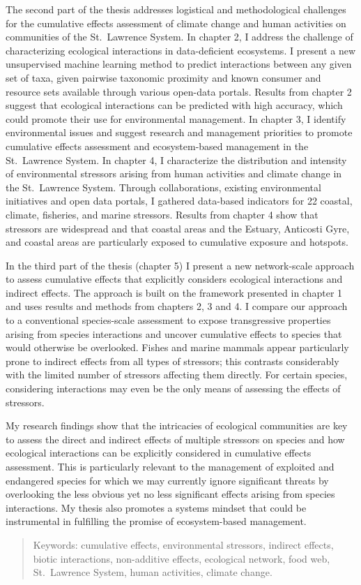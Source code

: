 The second part of the thesis addresses logistical and methodological
challenges for the cumulative effects assessment of climate change and
human activities on communities of the St.~Lawrence System. In chapter
2, I address the challenge of characterizing ecological interactions in
data-deficient ecosystems. I present a new unsupervised machine learning
method to predict interactions between any given set of taxa, given
pairwise taxonomic proximity and known consumer and resource sets
available through various open-data portals. Results from chapter 2
suggest that ecological interactions can be predicted with high
accuracy, which could promote their use for environmental management. In
chapter 3, I identify environmental issues and suggest research and
management priorities to promote cumulative effects assessment and
ecosystem-based management in the St.~Lawrence System. In chapter 4, I
characterize the distribution and intensity of environmental stressors
arising from human activities and climate change in the St.~Lawrence
System. Through collaborations, existing environmental initiatives and
open data portals, I gathered data-based indicators for 22 coastal,
climate, fisheries, and marine stressors. Results from chapter 4 show
that stressors are widespread and that coastal areas and the Estuary,
Anticosti Gyre, and coastal areas are particularly exposed to cumulative
exposure and hotspots.

In the third part of the thesis (chapter 5) I present a new
network-scale approach to assess cumulative effects that explicitly
considers ecological interactions and indirect effects. The approach is
built on the framework presented in chapter 1 and uses results and
methods from chapters 2, 3 and 4. I compare our approach to a
conventional species-scale assessment to expose transgressive properties
arising from species interactions and uncover cumulative effects to
species that would otherwise be overlooked. Fishes and marine mammals
appear particularly prone to indirect effects from all types of
stressors; this contrasts considerably with the limited number of
stressors affecting them directly. For certain species, considering
interactions may even be the only means of assessing the effects of
stressors.

My research findings show that the intricacies of ecological communities
are key to assess the direct and indirect effects of multiple stressors
on species and how ecological interactions can be explicitly considered
in cumulative effects assessment. This is particularly relevant to the
management of exploited and endangered species for which we may
currently ignore significant threats by overlooking the less obvious yet
no less significant effects arising from species interactions. My thesis
also promotes a systems mindset that could be instrumental in fulfilling
the promise of ecosystem-based management.

\begin{quote}
Keywords: cumulative effects, environmental stressors, indirect effects,
biotic interactions, non-additive effects, ecological network, food web,
St.~Lawrence System, human activities, climate change.
\end{quote}
